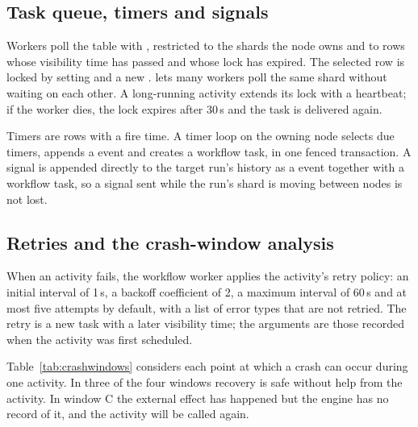 \subsection{Task queue, timers and signals}

Workers poll the  table with
, restricted to the shards the
node owns and to rows whose visibility time has passed and whose lock has
expired. The selected row is locked by setting  and a new
.  lets many workers poll the same shard
without waiting on each other. A long-running activity extends its lock with
a heartbeat; if the worker dies, the lock expires after 30\,s and the task is
delivered again.

Timers are rows with a fire time. A timer loop on the owning node selects due
timers, appends a  event and creates a workflow task, in one
fenced transaction. A signal is appended directly to the target run's history
as a  event together with a workflow task, so a signal sent
while the run's shard is moving between nodes is not lost.

\subsection{Retries and the crash-window analysis}
\label{sec:crashwindows}

When an activity fails, the workflow worker applies the activity's retry
policy: an initial interval of 1\,s, a backoff coefficient of 2, a maximum
interval of 60\,s and at most five attempts by default, with a list of error
types that are not retried. The retry is a new task with a later visibility
time; the arguments are those recorded when the activity was first
scheduled.

Table~\ref{tab:crashwindows} considers each point at which a crash can occur
during one activity. In three of the four windows recovery is safe without
help from the activity. In window C the external effect has happened but the
engine has no record of it, and the activity will be called again.

